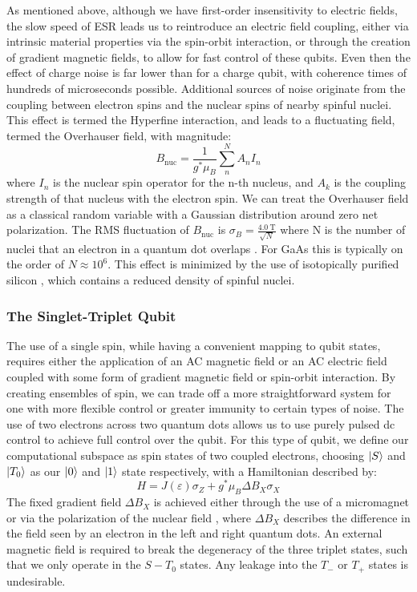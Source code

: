As mentioned above, although we have first-order insensitivity to electric fields, the slow speed of ESR leads us to
reintroduce an electric field coupling, either via intrinsic material properties via the spin-orbit interaction, or through
the creation of gradient magnetic fields, to allow for fast control of these qubits. Even then the effect of charge noise
is far lower than for a charge qubit, with coherence times of hundreds of microseconds possible. Additional sources
of noise originate from the coupling between electron spins and the nuclear spins of nearby spinful nuclei. This
effect is termed the Hyperfine interaction, and leads to a fluctuating field, termed the Overhauser field, with magnitude:
\begin{equation}
  B_{\textrm{nuc}} = \frac{1}{g^* \mu_B} \sum^N_n A_nI_n
\end{equation}
where $I_n$ is the nuclear spin operator for the n-th nucleus, and $A_k$ is the coupling strength of that nucleus with the
electron spin. We can treat the Overhauser field as a classical random variable with a Gaussian distribution around zero net
polarization. The RMS fluctuation of $B_{\textrm{nuc}}$ is $\sigma_B = \tfrac{\SI{4.0}{\tesla}}{\sqrt{N}}$ where N is the number of
nuclei that an electron in a quantum dot overlaps \cite{PhysRevB.76.035315}. For GaAs this is typically on the order of $N \approx 10^6$.
This effect is minimized by the use of isotopically purified silicon \cite{itoh_watanabe_2014}, which contains a
reduced density of spinful nuclei.

\subsubsection{The Singlet-Triplet Qubit}
The use of a single spin, while having a convenient mapping to qubit states, requires either the application of an AC magnetic field
or an AC electric field coupled with some form of gradient magnetic field or spin-orbit interaction. By creating ensembles of
spin, we can trade off a more straightforward system for one with more flexible control or greater immunity to certain types of noise.
The use of two electrons across two quantum dots allows us to use purely pulsed dc control to achieve full control
over the qubit. For this type of qubit, we define our computational subspace as spin states of two coupled electrons, choosing
$\ket{S}$ and $\ket{T_0}$ as our $\ket{0}$ and $\ket{1}$ state respectively, with a Hamiltonian described by:
\begin{equation}
  H = J(\varepsilon)\sigma_Z + g^* \mu_B \Delta B_X \sigma_X
\end{equation}
The fixed gradient field $\Delta B_X$ is achieved either through the use of a micromagnet or via the polarization of the nuclear
field \cite{PhysRevLett.105.216803}, where $\Delta B_X$ describes the difference in the field seen by an electron in the left and
right quantum dots. An external magnetic field is required to break the degeneracy of the three triplet states, such that
we only operate in the $S-T_0$ states. Any leakage into the $T_-$ or $T_+$ states is undesirable.

